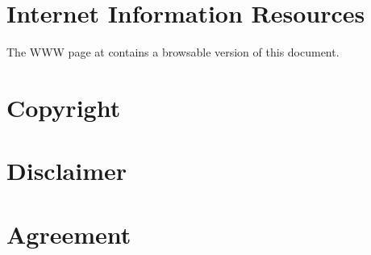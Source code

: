 \section{Internet Information Resources}

The \Devise WWW page at
 contains a browsable
version of this document.

\newpage
\section*{Copyright}



\section*{Disclaimer}



\newpage
\section*{Agreement}




